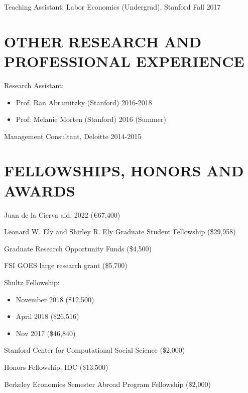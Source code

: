\documentclass[margin]{res} %
\begin{document}
\begin{resume}
Teaching Assistant: Labor Economics (Undergrad), Stanford \hfill Fall 2017

 
\section{OTHER RESEARCH AND PROFESSIONAL EXPERIENCE}
 Research Assistant:
\begin{itemize}
	\item Prof. Ran Abramitzky (Stanford) \hfill 2016-2018
	\item Prof. Melanie Morten (Stanford) \hfill 2016 (Summer)
\end{itemize}
 
 Management Consultant, Deloitte \hfill 2014-2015 


\section{FELLOWSHIPS, HONORS AND AWARDS}
		
		Juan de la Cierva aid, 2022 (\euro{67,400})

		 Leonard W. Ely and Shirley R. Ely Graduate Student Fellowship (\$29,958)

     Graduate Research Opportunity Funds (\$4,500)

     FSI GOES large research grant (\$5,700)

     Shultz Fellowship:
     \begin{itemize}
     	\item November 2018 (\$12,500)
     	\item April 2018 (\$26,516)
     	\item Nov 2017 (\$46,840)
     \end{itemize}

		 Stanford Center for Computational Social Science (\$2,000) 

		 Honors Fellowship, IDC (\$13,500) 

		 Berkeley Economics Semester Abroad Program Fellowship (\$2,000) 


\end{resume}
\end{document}
